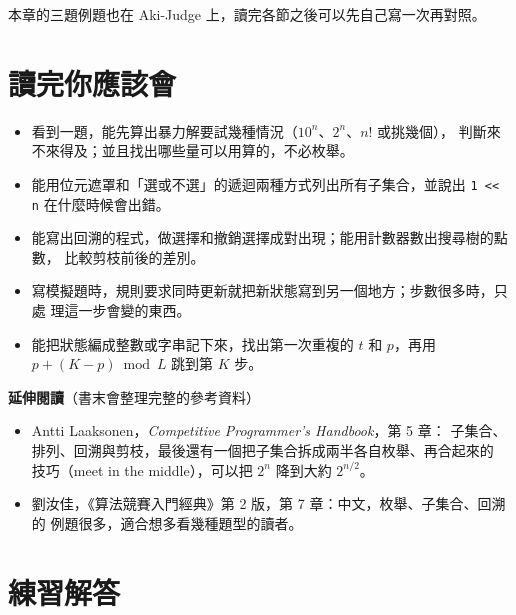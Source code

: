 本章的三題例題也在 Aki-Judge 上，讀完各節之後可以先自己寫一次再對照。

\section{讀完你應該會}
\label{sec:ch4-checklist}

\begin{itemize}
\item 看到一題，能先算出暴力解要試幾種情況（$10^n$、$2^n$、$n!$ 或挑幾個），
判斷來不來得及；並且找出哪些量可以用算的，不必枚舉。
\item 能用位元遮罩和「選或不選」的遞迴兩種方式列出所有子集合，並說出
\texttt{1 << n} 在什麼時候會出錯。
\item 能寫出回溯的程式，做選擇和撤銷選擇成對出現；能用計數器數出搜尋樹的點數，
比較剪枝前後的差別。
\item 寫模擬題時，規則要求同時更新就把新狀態寫到另一個地方；步數很多時，只處
理這一步會變的東西。
\item 能把狀態編成整數或字串記下來，找出第一次重複的 $t$ 和 $p$，再用
$p + (K - p) \bmod L$ 跳到第 $K$ 步。
\end{itemize}

\textbf{延伸閱讀}（書末會整理完整的參考資料）

\begin{itemize}
\item Antti Laaksonen，\textit{Competitive Programmer's Handbook}，第 5 章：
子集合、排列、回溯與剪枝，最後還有一個把子集合拆成兩半各自枚舉、再合起來的
技巧（meet in the middle），可以把 $2^n$ 降到大約 $2^{n/2}$。
\item 劉汝佳，《算法競賽入門經典》第 2 版，第 7 章：中文，枚舉、子集合、回溯的
例題很多，適合想多看幾種題型的讀者。
\end{itemize}

\section*{練習解答}

